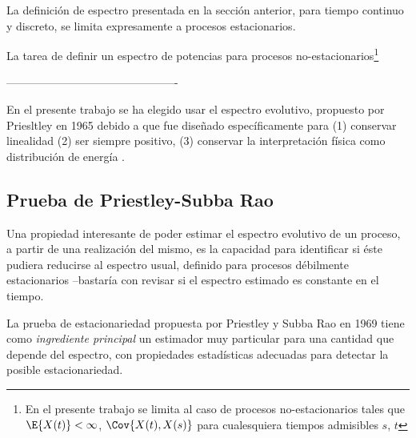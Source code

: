 La definición de espectro presentada en la sección anterior, para tiempo continuo y discreto, se
limita expresamente a procesos estacionarios.

La tarea de definir un espectro de potencias para procesos no-estacionarios\footnote{En el 
presente trabajo se limita al caso de procesos no-estacionarios \xt tales que $\E{X(t)}<\infty$, 
$\Cov{X(t),X(s)}$ para cualesquiera tiempos admisibles $s$, $t$} 


----------------------------------------------



En el presente trabajo se ha elegido usar el espectro evolutivo, propuesto por Priesltley en
1965 \cite{Priestley65} debido a que fue diseñado específicamente para (1) conservar linealidad 
(2) ser siempre positivo, (3) conservar la interpretación física como distribución de energía
\cite{Loynes68}.



\subsection{Prueba de Priestley-Subba Rao}

Una propiedad interesante de poder estimar el espectro evolutivo de un proceso, a partir de una 
realización del mismo, es la capacidad para identificar si éste pudiera reducirse al espectro 
usual, definido para procesos débilmente estacionarios --bastaría con revisar si el espectro 
estimado es constante en el tiempo.

La prueba de estacionariedad propuesta por Priestley y Subba Rao en 1969 \cite{Priestley69} tiene 
como \textit{ingrediente principal} un estimador muy particular para una cantidad que depende del 
espectro, con propiedades estadísticas adecuadas para detectar la posible estacionariedad.

